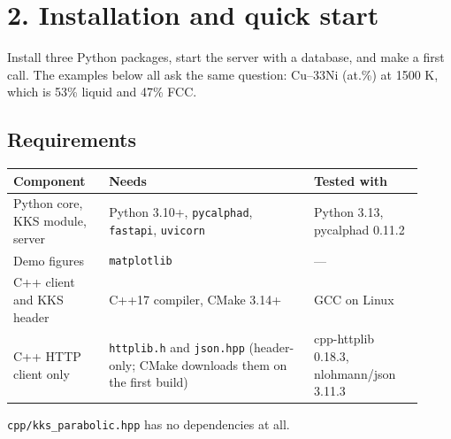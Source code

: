 \documentclass[12pt,a4paper]{article}
\begin{document}
\section*{2. Installation and quick start}
Install three Python packages, start the server with a database, and make a first call. The examples below all ask the same question: Cu--33Ni (at.\%) at 1500 K, which is 53\% liquid and 47\% FCC.


\subsection*{Requirements}
\begingroup\small
\begin{longtable}{>{\raggedright\arraybackslash}p{0.216\linewidth}>{\raggedright\arraybackslash}p{0.458\linewidth}>{\raggedright\arraybackslash}p{0.247\linewidth}}
\toprule
\textbf{Component} & \textbf{Needs} & \textbf{Tested with} \\
\midrule
\endhead
Python core, KKS module, server & Python 3.10+, \texttt{pycalphad}, \texttt{fastapi}, \texttt{uvicorn} & Python 3.13, pycalphad 0.11.2 \\
Demo figures & \texttt{matplotlib} & --- \\
C++ client and KKS header & C++17 compiler, CMake 3.14+ & GCC on Linux \\
C++ HTTP client only & \texttt{httplib.\allowbreak{}h} and \texttt{json.\allowbreak{}hpp} (header-only; CMake downloads them on the first build) & cpp-httplib 0.18.3, nlohmann/json 3.11.3 \\
\bottomrule
\end{longtable}
\endgroup
\texttt{cpp/\allowbreak{}kks\_\allowbreak{}parabolic.\allowbreak{}hpp} has no dependencies at all.


\end{document}
